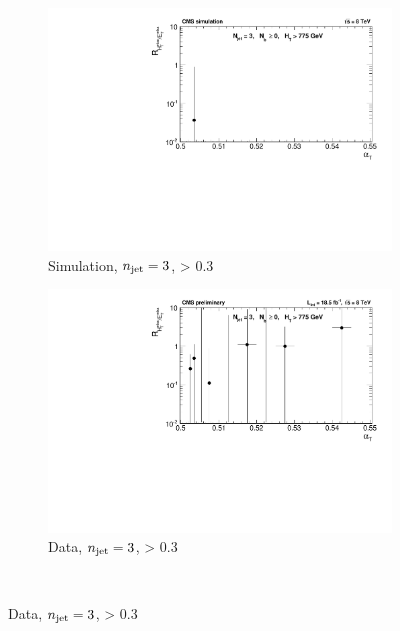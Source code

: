 \begin{figure}[p!]
    \begin{subfigure}[b]{0.46\textwidth}
      \includegraphics[width=\textwidth]{Figs/dphi/chris2/qcd_mc/dphi_gt0p3/v2/ratio_eq3j_ge0b_775}
      \caption{Simulation, $n_{\text{jet}} = 3$, \mindphistar > 0.3}
      \label{fig:rdphi_sim_j3_gt0p3}
    \end{subfigure}
    \begin{subfigure}[b]{0.46\textwidth}
      \includegraphics[width=\textwidth]{Figs/dphi/chris2/data/dphi_gt0p3/v2/ratio_eq3j_ge0b_775}
      \caption{Data, $n_{\text{jet}} = 3$, \mindphistar > 0.3}
      \label{fig:rdphi_data_j3_gt0p3}
    \end{subfigure} \\


\end{figure}
